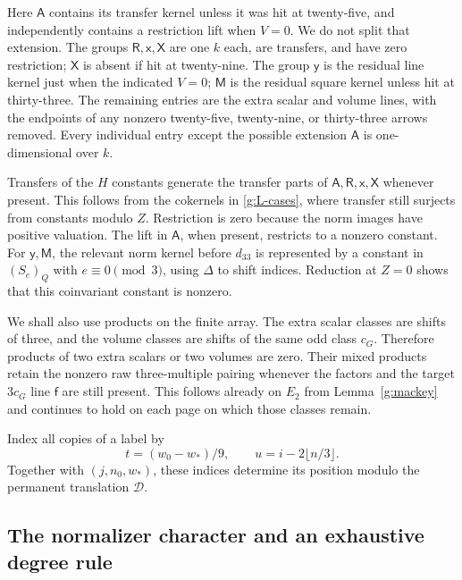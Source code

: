 Here $\mathsf A$ contains its transfer kernel unless it was
hit at twenty-five, and independently contains a restriction
lift when $V=0$.  We do not split that extension.  The groups
$\mathsf R,\mathsf x,\mathsf X$ are one $k$ each,
are transfers, and have zero restriction; $\mathsf X$ is
absent if hit at twenty-nine.  The group $\mathsf y$ is
the residual line kernel just when the indicated $V=0$;
$\mathsf M$ is the residual square kernel unless hit at
thirty-three.  The remaining entries are the extra scalar
and volume lines, with the endpoints of any nonzero
twenty-five, twenty-nine, or thirty-three arrows removed.
Every individual entry except the possible extension
$\mathsf A$ is one-dimensional over $k$.

Transfers of the $H$ constants generate the transfer parts of
$\mathsf A,\mathsf R,\mathsf x,\mathsf X$ whenever
present.  This follows from the cokernels in
\eqref{g:L-cases}, where transfer still surjects from
constants modulo $Z$.  Restriction is zero because the
norm images have positive valuation.  The lift in
$\mathsf A$, when present, restricts to a nonzero
constant.  For $\mathsf y,\mathsf M$, the relevant
norm kernel before $d_{33}$ is represented by a constant
in $(S_e)_Q$ with $e\equiv0\pmod3$, using $\Delta$
to shift indices.  Reduction at $Z=0$ shows that this
coinvariant constant is nonzero.

We shall also use products on the finite array.  The extra
scalar classes are shifts of three, and the volume classes
are shifts of the same odd class $c_G$.  Therefore products
of two extra scalars or two volumes are zero.  Their mixed
products retain the nonzero raw three-multiple pairing
whenever the factors and the target $3c_G$ line
$\mathsf f$ are still present.  This follows already on
$E_2$ from Lemma~\ref{g:mackey} and continues to hold
on each page on which those classes remain.

Index all copies of a label by
\begin{equation}\label{g:copy-index}
 t=(w_0-w_*)/9,\qquad u=i-2\lfloor n/3\rfloor.
\end{equation}
Together with $(j,n_0,w_*)$, these indices determine its
position modulo the permanent translation $\mathcal D$.

\subsection{The normalizer character and an exhaustive degree rule}

